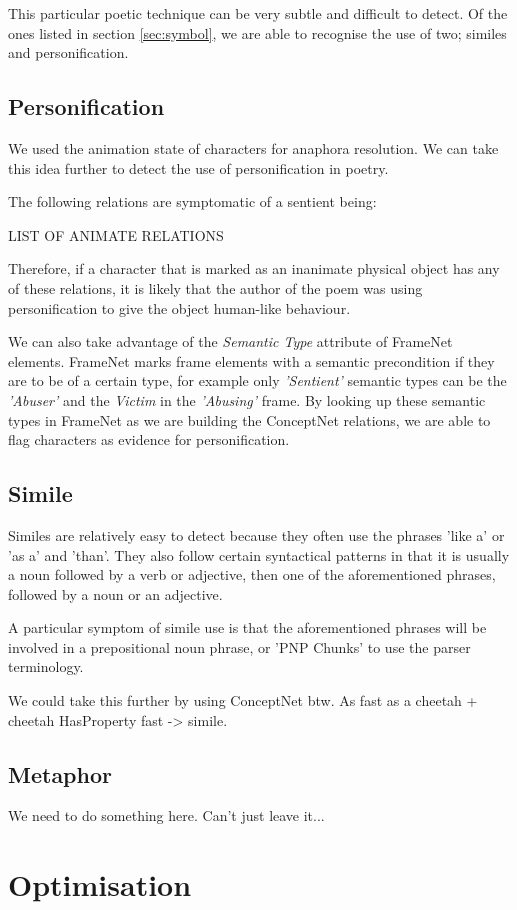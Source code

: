 This particular poetic technique can be very subtle and difficult to detect. Of the ones listed in section \ref{sec:symbol}, we are able to recognise the use of two; similes and personification.

\subsection{Personification}

We used the animation state of characters for anaphora resolution. We can take this idea further to detect the use of personification in poetry.

The following relations are symptomatic of a sentient being:

LIST OF ANIMATE RELATIONS

Therefore, if a character that is marked as an inanimate physical object has any of these relations, it is likely that the author of the poem was using personification to give the object human-like behaviour.

We can also take advantage of the \textit{Semantic Type} attribute of FrameNet elements. FrameNet marks frame elements with a semantic precondition if they are to be of a certain type, for example only \textit{'Sentient'} semantic types can be the \textit{'Abuser'} and the \textit{Victim} in the \textit{'Abusing'} frame. By looking up these semantic types in FrameNet as we are building the ConceptNet relations, we are able to flag characters as evidence for personification.

\subsection{Simile}

Similes are relatively easy to detect because they often use the phrases 'like a' or 'as a' and 'than'. They also follow certain syntactical patterns in that it is usually a noun followed by a verb or adjective, then one of the aforementioned phrases, followed by a noun or an adjective.

A particular symptom of simile use is that the aforementioned phrases will be involved in a prepositional noun phrase, or 'PNP Chunks' to use the parser terminology.

We could take this further by using ConceptNet btw. As fast as a cheetah + cheetah HasProperty fast -> simile.

\subsection{Metaphor}

We need to do something here. Can't just leave it...

\section{Optimisation}



